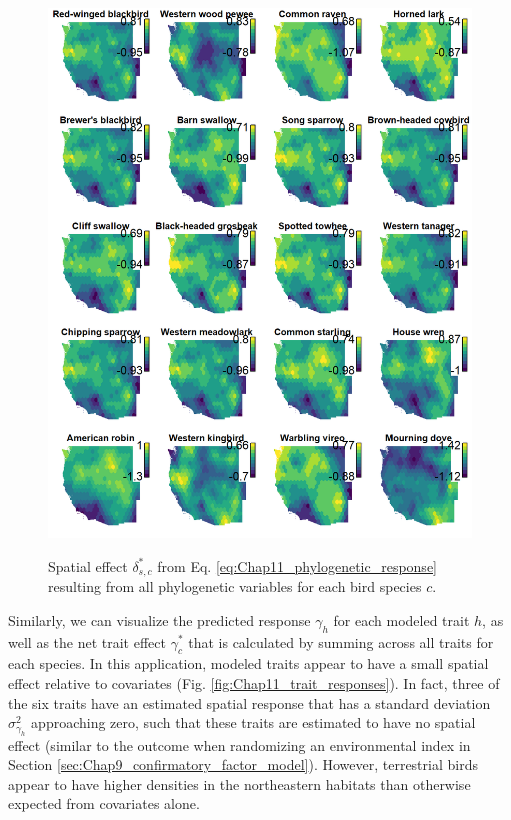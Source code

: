 \begin{figure}[!ht]
    \caption[Net phylogenetic effect for bird species]{Spatial effect \(\delta_{s,c}^*\) from Eq. \ref{eq:Chap11_phylogenetic_response} resulting from all phylogenetic variables for each bird species \(c\).}
    \includegraphics[width=5.5in]{Chap_11/Phylo.png}
    \label{fig:Chap11_phylogeny_effect}
\end{figure}

Similarly, we can visualize the predicted response \(\gamma_h\) for each modeled trait \(h\), as well as the net trait effect \(\gamma_c^*\) that is calculated by summing across all traits for each species.  In this application, modeled traits appear to have a small spatial effect relative to covariates (Fig. \ref{fig:Chap11_trait_responses}). In fact, three of the six traits have an estimated spatial response that has a standard deviation \(\sigma_{\gamma_h}^2\) approaching zero, such that these traits are estimated to have no spatial effect (similar to the outcome when randomizing an environmental index in Section \ref{sec:Chap9_confirmatory_factor_model}).  However, terrestrial birds appear to have higher densities in the northeastern habitats than otherwise expected from covariates alone.  

